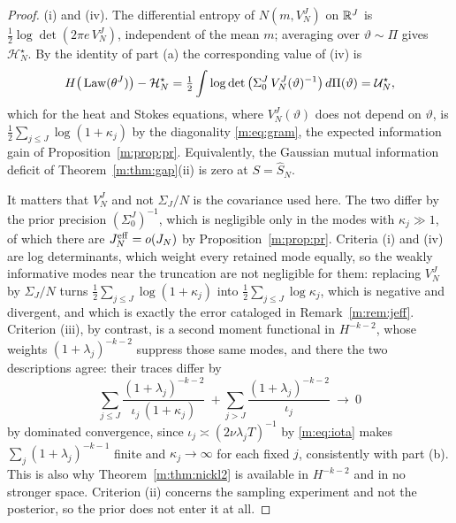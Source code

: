 \begin{proof}
(i) and (iv). The differential entropy of $N(m,V^J_N)$ on $\mathbb{R}^J$ is $\tfrac12\log\det(2\pi e\,V^J_N)$, independent of the mean $m$; averaging over $\vartheta\sim\Pi$ gives $\mathcal H^\star_N$. By the identity of part (a) the corresponding value of (iv) is
\[
H\big(\operatorname{Law}(\theta^J)\big)-\mathcal H^\star_N=\tfrac12\int\log\det\big(\Sigma^J_0\,V^J_N(\vartheta)^{-1}\big)\,d\Pi(\vartheta)=\mathcal U^\star_N ,
\]
which for the heat and Stokes equations, where $V^J_N(\vartheta)$ does not depend on $\vartheta$, is $\tfrac12\sum_{j\le J}\log(1+\kappa_j)$ by the diagonality \eqref{m:eq:gram}, the expected information gain of Proposition~\ref{m:prop:pr}. Equivalently, the Gaussian mutual information deficit of Theorem~\ref{m:thm:gap}(ii) is zero at $S=\hat S_N$.

It matters that $V^J_N$ and not $\Sigma_J/N$ is the covariance used here. The two differ by the prior precision $(\Sigma^J_0)^{-1}$, which is negligible only in the modes with $\kappa_j\gg1$, of which there are $J^{\rm eff}_N=o(J_N)$ by Proposition~\ref{m:prop:pr}. Criteria (i) and (iv) are log determinants, which weight every retained mode equally, so the weakly informative modes near the truncation are not negligible for them: replacing $V^J_N$ by $\Sigma_J/N$ turns $\tfrac12\sum_{j\le J}\log(1+\kappa_j)$ into $\tfrac12\sum_{j\le J}\log\kappa_j$, which is negative and divergent, and which is exactly the error cataloged in Remark~\ref{m:rem:jeff}. Criterion (iii), by contrast, is a second moment functional in $H^{-k-2}$, whose weights $(1+\lambda_j)^{-k-2}$ suppress those same modes, and there the two descriptions agree: their traces differ by
\[
\sum_{j\le J}\frac{(1+\lambda_j)^{-k-2}}{\iota_j\,(1+\kappa_j)}\ +\sum_{j>J}\frac{(1+\lambda_j)^{-k-2}}{\iota_j}\ \longrightarrow\ 0
\]
by dominated convergence, since $\iota_j\asymp(2\nu\lambda_jT)^{-1}$ by \eqref{m:eq:iota} makes $\sum_j(1+\lambda_j)^{-k-1}$ finite and $\kappa_j\to\infty$ for each fixed $j$, consistently with part (b). This is also why Theorem~\ref{m:thm:nickl2} is available in $H^{-k-2}$ and in no stronger space. Criterion (ii) concerns the sampling experiment and not the posterior, so the prior does not enter it at all.


\end{proof}
